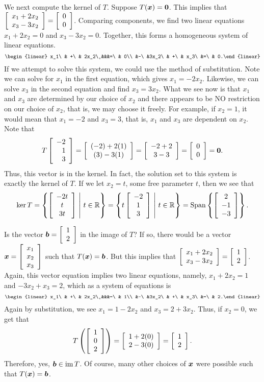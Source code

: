 \begin{Exam}
We next compute the kernel of $T$. Suppose $T(\bb x) = \bb 0$. This implies that $\vr{x_1+2x_2\\ x_3-3x_2} = \vr{0\\0}$. Comparing components, we find two linear equations $x_1+2x_2=0$ and $x_3-3x_2=0$. Together, this forms a homogeneous system of linear equations. 
\[\begin{linear} x_1\ & +\ & 2x_2\ &&&=\ & 0\\
&-\ &3x_2\ & +\ & x_3\ &=\ & 0.\end{linear}\] If we attempt to solve this system, we could use the method of substitution. Note we can solve for $x_1$ in the first equation, which gives $x_1 = -2x_2$. Likewise, we can solve $x_3$ in the second equation and find $x_3=3x_2$. What we see now is that $x_1$ and $x_3$ are determined by our choice of $x_2$ and there appears to be NO restriction on our choice of $x_2$, that is, we may choose it freely.  For example, if $x_2=1$, it would mean that $x_1=-2$ and $x_3=3$, that is, $x_1$ and $x_3$ are dependent on $x_2$. Note that 
\[T\vr{-2\\1\\3} = \mtx{c}{(-2)+2(1)\\(3)-3(1)} = \mtx{c}{-2+2\\3-3} = \vr{0\\0} = \bb 0.\] Thus, this vector is in the kernel. In fact, the solution set to this system is exactly the kernel of $T$. If we let $x_2=t$, some free parameter $t$, then we see that \[\ker T = \left\{\mtx{c}{-2t\\ t \\ 3t}\ \middle|\ t\in \R\right\} = \left\{t\mtx{c}{-2\\ 1 \\ 3}\ \middle|\ t\in \R\right\} =  \Span\left\{\mtx{c}{2\\ -1 \\ -3}\right\}.\]

Is the vector $\bb b = \vr{1\\2}$ in the image of $T$? If so, there would be a vector $\bb x = \vr{x_1\\x_2\\x_3}$ such that $T(\bb x) = \bb b$. But this implies that $\vr{x_1+2x_2\\ x_3-3x_2} = \vr{1\\2}$. Again, this vector equation implies two linear equations, namely, $x_1+2x_2=1$ and $-3x_2+x_3=2$, which as a system of equations is
\[\begin{linear} x_1\ & +\ & 2x_2\ &&&=\ & 1\\
&-\ &3x_2\ & +\ & x_3\ &=\ & 2.\end{linear}\] Again by substitution, we see $x_1 = 1-2x_2$ and $x_3=2+3x_2$. Thus, if $x_2=0$, we get that 
\[T\left(\vr{1\\0\\2}\right) = \vr{1+2(0) \\ 2 - 3(0)} = \vr{1\\2}.\] Therefore, yes, $\bb b \in \im T$. Of course, many other choices of $\bb x$ were possible such that $T(\bb x) = \bb b$.
\end{Exam}\vs

